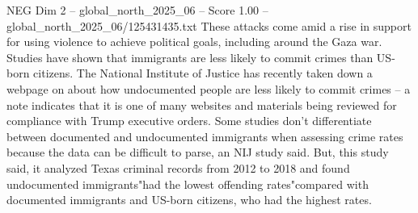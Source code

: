 \begin{textsample}{NEG Dim 2 – global\_north\_2025\_06 – Score 1.00 – global\_north\_2025\_06/125431435.txt}
These attacks come amid a rise in support for using violence to achieve political goals, including around the Gaza war.
Studies have shown that immigrants are less likely to commit crimes than US-born citizens.
The National Institute of Justice has recently taken down a webpage on about how undocumented people are less likely to commit crimes -- a note indicates that it is one of many websites and materials being reviewed for compliance with Trump executive orders.
Some studies don't differentiate between documented and undocumented immigrants when assessing crime rates because the data can be difficult to parse, an NIJ study said.
But, this study said, it analyzed Texas criminal records from 2012 to 2018 and found undocumented immigrants"had the lowest offending rates"compared with documented immigrants and US-born citizens, who had the highest rates.

\end{textsample}
